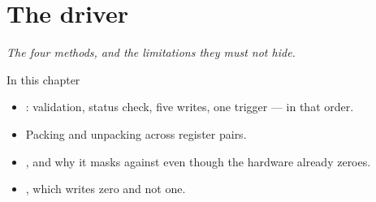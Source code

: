 \chapter{The driver}
\label{ch:driver}


{\large\itshape The four methods, and the limitations they must not hide.\par}

\begin{chapterbox}{In this chapter}
\begin{itemize}
  \item {}: validation, status check, five writes, one trigger --- in that order.
  \item Packing and unpacking across register pairs.
  \item {}, and why it masks against  even though the hardware already
    zeroes.
  \item {}, which writes zero and not one.
\end{itemize}
\end{chapterbox}




